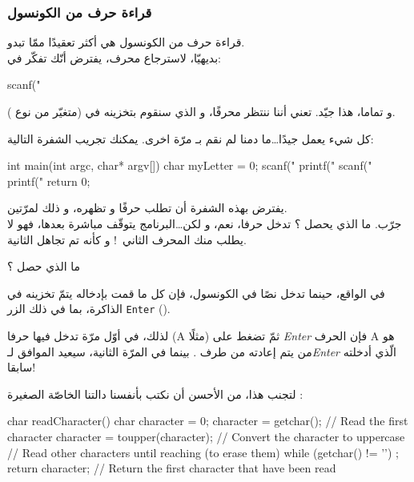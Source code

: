 \subsubsection{قراءة حرف من الكونسول}
قراءة حرف من الكونسول هي أكثر تعقيدًا ممّا تبدو.\\
بديهيّا، لاسترجاع محرف، يفترض أنّك تفكّر في:

\begin{Csource}
scanf("%
\end{Csource}

و تماما، هذا جيّد.
تعني أننا ننتظر محرفًا، و الذي سنقوم بتخزينه في
(متغيّر من نوع
).


كل شيء يعمل جيدًا\dots ما دمنا لم نقم بـ
مرّة اخرى. يمكنك تجريب الشفرة التالية:

\begin{Csource}
int main(int argc, char* argv[])
{
 	char myLetter = 0;
 	scanf("%
 	printf("%
 	scanf("%
 	printf("%
 	return 0;
}
\end{Csource}

يفترض بهذه الشفرة أن تطلب حرفًا و تظهره، و ذلك لمرّتين.\\
جرّب. ما الذي يحصل ؟ تدخل حرفا، نعم، و لكن\dots البرنامج يتوقّف مباشرة بعدها، فهو لا يطلب منك المحرف الثاني~! و كأنه تم تجاهل
الثانية.

\begin{question}
ما الذي حصل ؟
\end{question}

في الواقع، حينما تدخل نصًا في الكونسول، فإن كل ما قمت بإدخاله يتمّ تخزينه في الذاكرة، بما في ذلك الزر
\texttt{Enter}
().

لذلك، في أوّل مرّة تدخل فيها حرفا
(\textenglish{A}
مثلًا) ثمّ تضغط على
\textit{\textenglish{Enter}}
فإن الحرف
\textenglish{A}
هو من يتم إعادته من طرف
.
بينما في المرّة الثانية،
سيعيد
الموافق لـ\textit{\textenglish{Enter}}
الّذي أدخلته سابقا!

لتجنب هذا، من الأحسن أن نكتب بأنفسنا دالتنا الخاصّة الصغيرة
 :

\begin{Csource}
char readCharacter()
{
  char character = 0;
  character = getchar(); // Read the first character
  character = toupper(character); // Convert the character to uppercase
  // Read other characters until reaching \n (to erase them)
  while (getchar() != '\n') ;
  return character; // Return the first character that have been read
}
\end{Csource}

